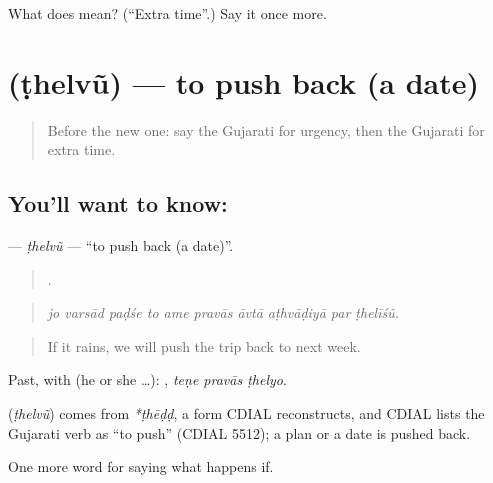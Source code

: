 \begin{tcolorbox}[breakable,colback=teal!4,colframe=teal!35!black,title={Before you move on}]
What does  mean? (\textquotedblleft{}Extra time\textquotedblright{}.) Say it once more.
\end{tcolorbox}
\section[\texorpdfstring{\gu{ઠેલવું} (ṭhelvũ)}{ઠેલવું (ṭhelvũ)}]{ (ṭhelvũ) — to push back (a date)}

\label{lesson:GU-C530-thelvu}



\begin{quote}
Before the new one: say the Gujarati for urgency, then the Gujarati for extra time.
\end{quote}

\subsection*{You'll want to know: }
\textbf{} — \emph{ṭhelvũ} — \textquotedblleft{}to push back (a date)\textquotedblright{}.

\begin{quote}
         .
\end{quote}

\begin{quote}
\emph{jo varsād paḍśe to ame pravās āvtā aṭhvāḍiyā par ṭhelīśũ.}
\end{quote}

\begin{quote}
If it rains, we will push the trip back to next week.
\end{quote}

Past, with  (he or she …):   , \emph{teṇe pravās ṭhelyo}.

\begin{cousinweb}
\textbf{} (\emph{ṭhelvũ}) comes from \emph{*ṭhēḍḍ}, a form CDIAL reconstructs, and CDIAL lists the Gujarati verb as \textquotedblleft{}to push\textquotedblright{} (CDIAL 5512); a plan or a date is pushed back.
\end{cousinweb}

\begin{grammarlens}[title={What you've built}]
One more word for saying what happens if.
\end{grammarlens}

